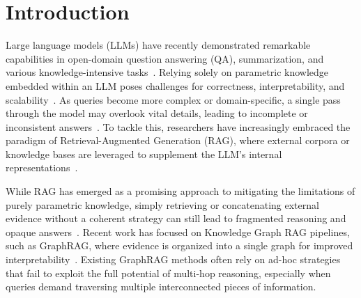 \documentclass[runningheads]{llncs}
\begin{document}
\section{Introduction}

Large language models (LLMs) have recently demonstrated remarkable capabilities in open-domain question answering (QA), summarization, and various knowledge-intensive tasks~\cite{wang2023survey,kamalloo2023evaluating}. Relying solely on parametric knowledge embedded within an LLM poses challenges for correctness, interpretability, and scalability~\cite{kaddour2023challenges}. As queries become more complex or domain-specific, a single pass through the model may overlook vital details, leading to incomplete or inconsistent answers~\cite{zhu2021retrieving}. To tackle this, researchers have increasingly embraced the paradigm of Retrieval-Augmented Generation (RAG), where external corpora or knowledge bases are leveraged to supplement the LLM's internal representations~\cite{lewis2020retrieval}. 

While RAG has emerged as a promising approach to mitigating the limitations of purely parametric knowledge, simply retrieving or concatenating external evidence without a coherent strategy can still lead to fragmented reasoning and opaque answers~\cite{lewis2020retrieval,guu2020retrieval}. Recent work has focused on Knowledge Graph RAG pipelines, such as GraphRAG, where evidence is organized into a single graph for improved interpretability~\cite{edge2024local,soman2024biomedical,guo2024lightrag,kang2023knowledge}. Existing GraphRAG methods often rely on ad-hoc strategies that fail to exploit the full potential of multi-hop reasoning, especially when queries demand traversing multiple interconnected pieces of information.
\end{document}
